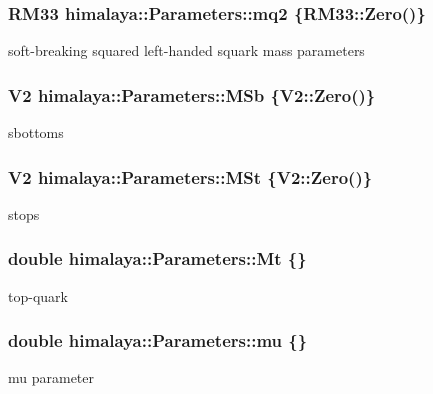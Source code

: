 \subsubsection[{\texorpdfstring{mq2}{mq2}}]{\setlength{\rightskip}{0pt plus 5cm}R\+M33 himalaya\+::\+Parameters\+::mq2 \{R\+M33\+::\+Zero()\}}\hypertarget{structhimalaya_1_1Parameters_a0df106ebf113926e6fa1c47ca0c3123e}{}\label{structhimalaya_1_1Parameters_a0df106ebf113926e6fa1c47ca0c3123e}
soft-\/breaking squared left-\/handed squark mass parameters 
\subsubsection[{\texorpdfstring{M\+Sb}{MSb}}]{\setlength{\rightskip}{0pt plus 5cm}V2 himalaya\+::\+Parameters\+::\+M\+Sb \{V2\+::\+Zero()\}}\hypertarget{structhimalaya_1_1Parameters_acac147286ca9263f5fdba7a718c17506}{}\label{structhimalaya_1_1Parameters_acac147286ca9263f5fdba7a718c17506}
sbottoms 
\subsubsection[{\texorpdfstring{M\+St}{MSt}}]{\setlength{\rightskip}{0pt plus 5cm}V2 himalaya\+::\+Parameters\+::\+M\+St \{V2\+::\+Zero()\}}\hypertarget{structhimalaya_1_1Parameters_a628b2a3f3c04ebc009a1f982dae144b9}{}\label{structhimalaya_1_1Parameters_a628b2a3f3c04ebc009a1f982dae144b9}
stops 
\subsubsection[{\texorpdfstring{Mt}{Mt}}]{\setlength{\rightskip}{0pt plus 5cm}double himalaya\+::\+Parameters\+::\+Mt \{\}}\hypertarget{structhimalaya_1_1Parameters_ad2b817fb45673b04ba2aac183b2719c3}{}\label{structhimalaya_1_1Parameters_ad2b817fb45673b04ba2aac183b2719c3}
top-\/quark 
\subsubsection[{\texorpdfstring{mu}{mu}}]{\setlength{\rightskip}{0pt plus 5cm}double himalaya\+::\+Parameters\+::mu \{\}}\hypertarget{structhimalaya_1_1Parameters_ac3b46727f8e81adce0d984fe118ad8ba}{}\label{structhimalaya_1_1Parameters_ac3b46727f8e81adce0d984fe118ad8ba}
mu parameter 
